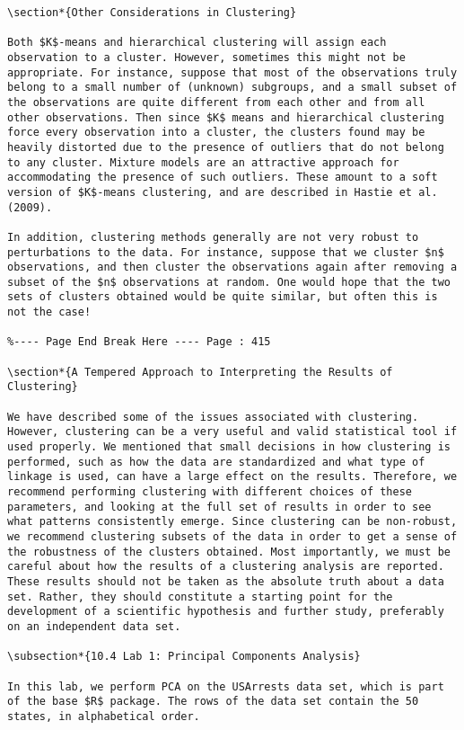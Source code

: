 \documentclass[10pt]{article}
\begin{document}
\begin{verbatim}
\section*{Other Considerations in Clustering}

Both $K$-means and hierarchical clustering will assign each observation to a cluster. However, sometimes this might not be appropriate. For instance, suppose that most of the observations truly belong to a small number of (unknown) subgroups, and a small subset of the observations are quite different from each other and from all other observations. Then since $K$ means and hierarchical clustering force every observation into a cluster, the clusters found may be heavily distorted due to the presence of outliers that do not belong to any cluster. Mixture models are an attractive approach for accommodating the presence of such outliers. These amount to a soft version of $K$-means clustering, and are described in Hastie et al. (2009).

In addition, clustering methods generally are not very robust to perturbations to the data. For instance, suppose that we cluster $n$ observations, and then cluster the observations again after removing a subset of the $n$ observations at random. One would hope that the two sets of clusters obtained would be quite similar, but often this is not the case!

%---- Page End Break Here ---- Page : 415

\section*{A Tempered Approach to Interpreting the Results of Clustering}

We have described some of the issues associated with clustering. However, clustering can be a very useful and valid statistical tool if used properly. We mentioned that small decisions in how clustering is performed, such as how the data are standardized and what type of linkage is used, can have a large effect on the results. Therefore, we recommend performing clustering with different choices of these parameters, and looking at the full set of results in order to see what patterns consistently emerge. Since clustering can be non-robust, we recommend clustering subsets of the data in order to get a sense of the robustness of the clusters obtained. Most importantly, we must be careful about how the results of a clustering analysis are reported. These results should not be taken as the absolute truth about a data set. Rather, they should constitute a starting point for the development of a scientific hypothesis and further study, preferably on an independent data set.

\subsection*{10.4 Lab 1: Principal Components Analysis}

In this lab, we perform PCA on the USArrests data set, which is part of the base $R$ package. The rows of the data set contain the 50 states, in alphabetical order.
\end{verbatim}
\end{document}
